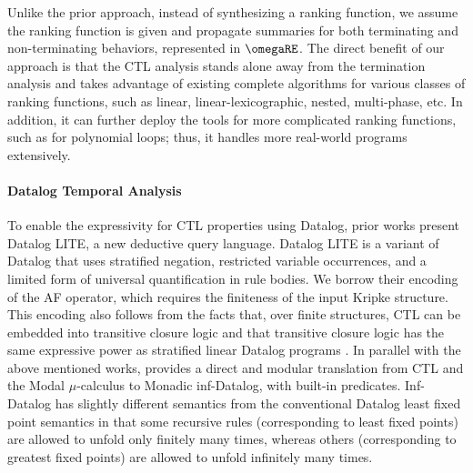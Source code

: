 Unlike the prior approach, instead of synthesizing a ranking function, we assume the ranking function is given and propagate summaries for both terminating and non-terminating behaviors, represented in $\omegaRE$.  
The direct benefit of our approach is that the CTL analysis stands alone away from the termination analysis and takes advantage of existing complete algorithms for various classes of ranking functions, such as linear, linear-lexicographic, nested, multi-phase, etc. 
In addition, it can further deploy the tools for more complicated ranking functions, such as for polynomial loops; thus, it handles more real-world programs extensively. 











\vspace{-1mm}
\noindent\paragraph{\textbf{Datalog Temporal Analysis}}

To enable the expressivity for CTL properties using Datalog, prior works \cite{gottlob2002datalog,gottlob2000linear}
present Datalog LITE, a new deductive query language. Datalog LITE is a variant of Datalog that uses stratified negation, restricted variable occurrences, and a limited form of universal quantification in rule bodies. 
We borrow their encoding of the AF operator, 
which requires the finiteness of the input Kripke structure. 
This encoding also follows from the facts that, over finite structures, CTL can be embedded into transitive closure logic \cite{DBLP:conf/cav/ImmermanV97} and that transitive closure logic has the same expressive power as stratified linear Datalog programs \cite{DBLP:journals/tcs/ConsensM93,DBLP:conf/csl/Gradel91}. 
In parallel with the above mentioned works, \cite{DBLP:journals/tcs/GuessarianFAA03}
provides a direct and modular translation from CTL and the Modal $\mu$-calculus to Monadic inf-Datalog, with built-in predicates. Inf-Datalog has slightly different semantics from the conventional Datalog least fixed point semantics in that some recursive rules (corresponding to least fixed points) are allowed to unfold only finitely many times, whereas others (corresponding to greatest fixed points) are allowed to unfold infinitely many times. 



